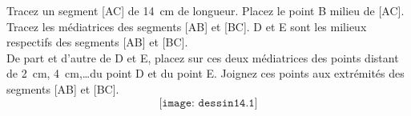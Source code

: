 Tracez un segment [AC] de 14~cm de longueur. Placez le point B milieu
de [AC]. Tracez les médiatrices des segments [AB] et [BC]. D et E sont
les milieux respectifs des segments [AB] et [BC].\\
De part et d'autre de D et E, placez sur ces deux médiatrices des
points distant de 2~cm, 4~cm,\ldots du point D et du point E. Joignez
ces points aux extrémités des segments [AB] et [BC].
\[\texttt{[image: dessin14.1]}\]